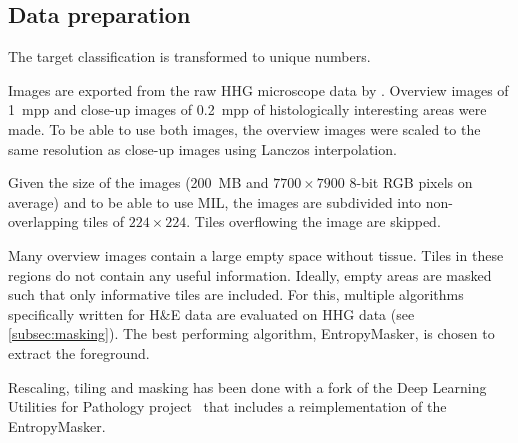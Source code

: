 \subsection{Data preparation}

The target classification is transformed to unique numbers.

Images are exported from the raw HHG microscope data by \citeauthor{Spies2023} .
Overview images of \qty{1}{mpp} and close-up images of \qty{0.2}{mpp} of histologically interesting areas were made.
To be able to use both images, the overview images were scaled to the same resolution as close-up images using Lanczos interpolation.

Given the size of the images (\qty{200}{MB} and $7700\times7900$ 8-bit RGB pixels on average) and to be able to use MIL, the images are subdivided into non-overlapping tiles of $224 \times 224$.
Tiles overflowing the image are skipped.

Many overview images contain a large empty space without tissue.
Tiles in these regions do not contain any useful information.
Ideally, empty areas are masked such that only informative tiles are included.
For this, multiple algorithms specifically written for H\&E data are evaluated on HHG data (see \cref{subsec:masking}).
The best performing algorithm, EntropyMasker, is chosen to extract the foreground.

Rescaling, tiling and masking has been done with a fork  of the Deep Learning Utilities for Pathology project~ that includes a reimplementation of the EntropyMasker.
